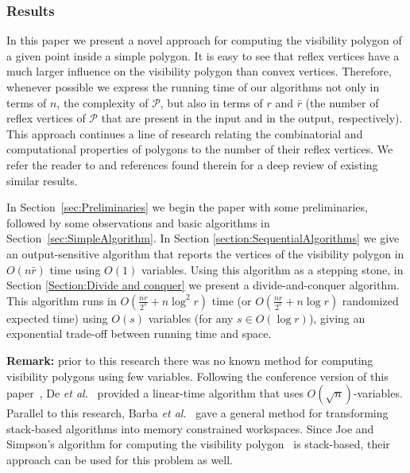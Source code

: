 \documentclass[a4paper]{article}
\newcommand{\Poly}{\ensuremath{\mathcal{P}}}               \newcommand{\bd}{\ensuremath{\partial \Poly} }                 \newcommand{\Vis}{\ensuremath{\mathrm{Vis}_\Poly}} \newcommand{\VisC}{\ensuremath{\mathrm{Vis}_{\mathcal{C}}}} \newcommand{\VisCprime}{\ensuremath{\mathrm{Vis}_{\mathcal{C'}}}} \newcommand{\E}{\ensuremath{\mathrm{E}}}                    \newcommand{\Rin}{\ensuremath{r}}      \newcommand{\Rout}{\ensuremath{\bar{r}}}      \newcommand{\Hout}{\ensuremath{\bar{h}}}      \newcommand{\chain}{\ensuremath{{\mathrm{Chain}}}}     \newcommand{\region}{\ensuremath{{{\mathcal R}}}}
\begin{document}
\subsubsection*{Results}


In this paper we present a novel approach for computing the visibility polygon of a given point inside a simple polygon. 
It is easy to see that reflex vertices have a much larger influence on the visibility polygon than convex vertices. Therefore, whenever possible we express the running time of our algorithms not only in terms of $n$, the complexity of $\Poly$, but also in terms of  $\Rin$ and $\Rout$ (the number of reflex vertices of $\Poly$ that are present in the input and in the output, respectively). This approach continues a line of research relating the combinatorial and computational properties of polygons to the number of their reflex vertices. We refer the reader to \cite{bdhilm-ghsc-07,akpv-got-12,bchm-gwp-10} and references found therein for a deep review of existing similar results.

In Section~\ref{sec:Preliminaries} we begin the paper with some preliminaries, followed by some observations and basic algorithms in Section~\ref{sec:SimpleAlgorithm}. In Section \ref{section:SequentialAlgorithms} we give an output-sensitive algorithm that reports the vertices of the visibility polygon in $O(n\Rout)$ time using $O(1)$ variables. Using this algorithm as a stepping stone, in Section \ref{Section:Divide and conquer} we present a divide-and-conquer algorithm. This algorithm runs in $O(\frac{nr}{2^{s}}+n\log^2 r)$ time (or $O(\frac{nr}{2^{s}}+n\log r)$ randomized expected time)  using $O(s)$ variables (for any $s\in O(\log r)$), giving an exponential trade-off between running time and space. 



{\bf Remark:} prior to this research there was no known method for computing visibility polygons using few variables. Following the conference version of this paper~\cite{bkls-cvpufv-11}, De {\em et al.}~\cite{dmn-seavpsp-12} provided a linear-time algorithm that uses $O(\sqrt{n})$-variables. Parallel to this research, Barba {\em et al.}~\cite{bklss-sttosba-13} gave a general method for transforming stack-based algorithms into memory constrained workspaces. Since Joe and Simpson's algorithm for computing the visibility polygon~\cite{js-clvpa-87} is stack-based, their approach can be used for this problem as well. 
\end{document}
